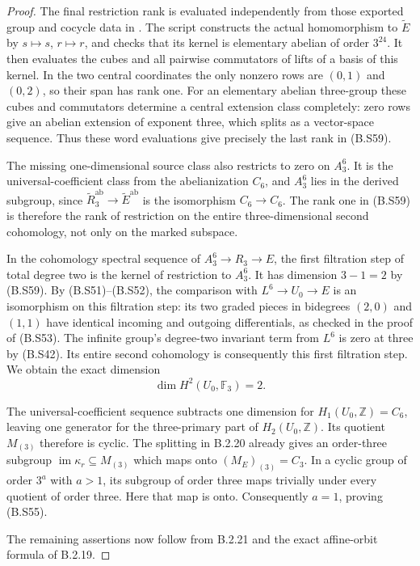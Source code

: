 \begin{proof}
The final restriction rank is evaluated independently
from those exported group and cocycle data in
.
The script constructs the actual homomorphism to
$\widetilde E$ by $s\mapsto s$, $r\mapsto r$, and
checks that its kernel is elementary abelian of
order $3^{24}$.  It then evaluates the cubes and
all pairwise commutators of lifts of a basis of
this kernel.  In the two central coordinates the
only nonzero rows are $(0,1)$ and $(0,2)$, so their
span has rank one.  For an elementary abelian
three-group these cubes and commutators determine
a central extension class completely: zero rows
give an abelian extension of exponent three,
which splits as a vector-space sequence.
Thus these word evaluations give precisely the
last rank in (B.S59).

The missing one-dimensional source class also
restricts to zero on $A_3^6$.  It is the
universal-coefficient class from the abelianization
$C_6$, and $A_3^6$ lies in the derived subgroup,
since $\widetilde R_3^{\mathrm{ab}}\to
\widetilde E^{\mathrm{ab}}$ is the isomorphism
$C_6\to C_6$.  The rank one in (B.S59) is
therefore the rank of restriction on the entire
three-dimensional second cohomology, not only
on the marked subspace.

In the cohomology spectral sequence of
$A_3^6\to R_3\to E$, the first filtration step
of total degree two is the kernel of restriction
to $A_3^6$.  It has dimension $3-1=2$ by (B.S59).
By (B.S51)--(B.S52), the comparison with
$L^6\to U_0\to E$ is an isomorphism on this
filtration step: its two graded pieces in
bidegrees $(2,0)$ and $(1,1)$ have identical
incoming and outgoing differentials, as checked
in the proof of (B.S53).  The infinite group's
degree-two invariant term from $L^6$ is zero
at three by (B.S42).  Its entire second
cohomology is consequently this first filtration
step.  We obtain the exact dimension
\[
                    \dim H^2(U_0,\mathbb F_3)=2.              \tag{B.S60}
\]

The universal-coefficient sequence subtracts one
dimension for $H_1(U_0,\mathbb Z)=C_6$, leaving
one generator for the three-primary part of
$H_2(U_0,\mathbb Z)$.  Its quotient $M_{(3)}$
therefore is cyclic.  The splitting in B.2.20
already gives an order-three subgroup
$\operatorname{im}\kappa_r\subseteq M_{(3)}$
which maps onto $(M_E)_{(3)}=C_3$.  In a cyclic
group of order $3^a$ with $a>1$, its subgroup of
order three maps trivially under every quotient
of order three.  Here that map is onto.
Consequently $a=1$, proving (B.S55).

The remaining assertions now follow from B.2.21
and the exact affine-orbit formula of B.2.19.
\end{proof}
